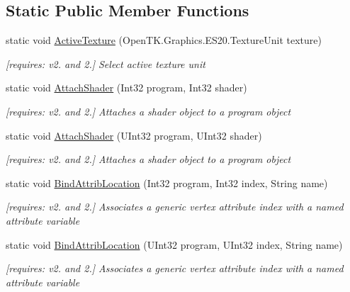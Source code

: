 \subsection*{Static Public Member Functions}
\begin{DoxyCompactItemize}
\item 
static void \hyperlink{class_open_t_k_1_1_graphics_1_1_e_s20_1_1_g_l_af56b7f59869416956981c70031abea1f}{Active\-Texture} (Open\-T\-K.\-Graphics.\-E\-S20.\-Texture\-Unit texture)
\begin{DoxyCompactList}\small\item\em \mbox{[}requires\-: v2. and 2.\mbox{]} Select active texture unit \end{DoxyCompactList}\item 
static void \hyperlink{class_open_t_k_1_1_graphics_1_1_e_s20_1_1_g_l_a96e9e463b7fd67bfda3ad9b9a1be6e47}{Attach\-Shader} (Int32 program, Int32 shader)
\begin{DoxyCompactList}\small\item\em \mbox{[}requires\-: v2. and 2.\mbox{]} Attaches a shader object to a program object \end{DoxyCompactList}\item 
static void \hyperlink{class_open_t_k_1_1_graphics_1_1_e_s20_1_1_g_l_ad249a01343dfe9a262692b1b47b8baf9}{Attach\-Shader} (U\-Int32 program, U\-Int32 shader)
\begin{DoxyCompactList}\small\item\em \mbox{[}requires\-: v2. and 2.\mbox{]} Attaches a shader object to a program object \end{DoxyCompactList}\item 
static void \hyperlink{class_open_t_k_1_1_graphics_1_1_e_s20_1_1_g_l_aac8cf2a78ef6efd1b880a86368e12a07}{Bind\-Attrib\-Location} (Int32 program, Int32 index, String name)
\begin{DoxyCompactList}\small\item\em \mbox{[}requires\-: v2. and 2.\mbox{]} Associates a generic vertex attribute index with a named attribute variable \end{DoxyCompactList}\item 
static void \hyperlink{class_open_t_k_1_1_graphics_1_1_e_s20_1_1_g_l_a8056b43914eab1b8164e087ecc7542c2}{Bind\-Attrib\-Location} (U\-Int32 program, U\-Int32 index, String name)
\begin{DoxyCompactList}\small\item\em \mbox{[}requires\-: v2. and 2.\mbox{]} Associates a generic vertex attribute index with a named attribute variable \end{DoxyCompactList}\item 

\end{DoxyCompactItemize}

